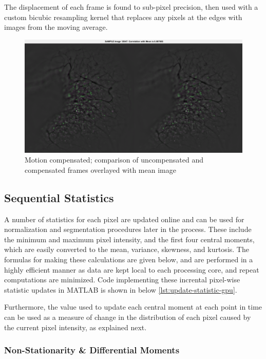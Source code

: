 The displacement of each frame is found to sub-pixel precision, then used with a custom bicubic resampling kernel that replaces any pixels at the edges with images from the moving average.



\begin{figure}[htb]\centering
	\includegraphics[width=12cm]{figures/motion_correction_sample.png}
	\caption{Motion compensated; comparison of uncompensated and compensated frames overlayed with mean image}
\end{figure}

\subsection{Sequential Statistics}\label{sec:sequential-statistics}

A number of statistics for each pixel are updated online and can be used for normalization and segmentation procedures later in the process.
These include the minimum and maximum pixel intensity, and the first four central moments, which are easily converted to the mean, variance, skewness, and kurtosis.
The formulas for making these calculations are given below, and are performed in a highly efficient manner as data are kept local to each processing core, and repeat computations are minimized.
Code implementing these incrental pixel-wise statistic updates in MATLAB is shown in below \ref{lst:update-statistic-gpu}.

Furthermore, the value used to update each central moment at each point in time can be used as a measure of change in the distribution of each pixel caused by the current pixel intensity, as explained next.

\subsubsection{Non-Stationarity \& Differential Moments}\label{sec:non-stationarity-differential-moments}

